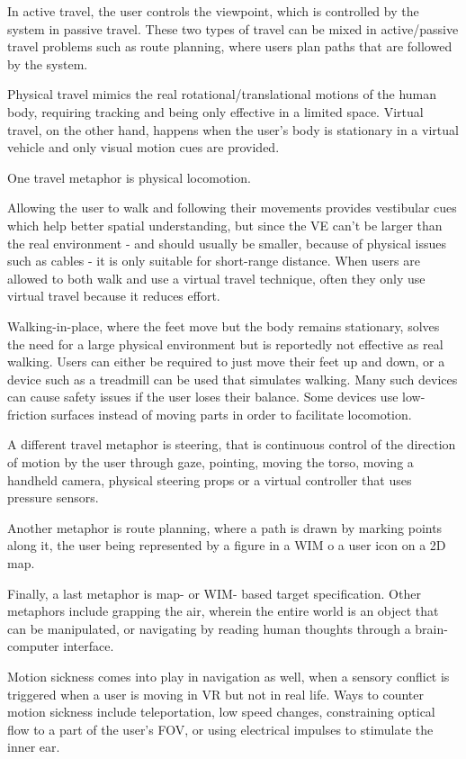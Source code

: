 \documentclass[a4paper]{article}
\begin{document}
In active travel, the user controls the viewpoint, which is controlled by the system in passive travel.
These two types of travel can be mixed in active/passive travel problems such as route planning, where users plan paths that are followed by the system.

Physical travel mimics the real rotational/translational motions of the human body, requiring tracking and being only effective in a limited space.
Virtual travel, on the other hand, happens when the user's body is stationary in a virtual vehicle and only visual motion cues are provided.

One travel metaphor is physical locomotion.

Allowing the user to walk and following their movements provides vestibular cues which help better spatial understanding, but since the VE can't be larger than the real environment - and should usually be smaller, because of physical issues such as cables - it is only suitable for short-range distance.
When users are allowed to both walk and use a virtual travel technique, often they only use virtual travel because it reduces effort.

Walking-in-place, where the feet move but the body remains stationary, solves the need for a large physical environment but is reportedly not effective as real walking.
Users can either be required to just move their feet up and down, or a device such as a treadmill can be used that simulates walking.
Many such devices can cause safety issues if the user loses their balance. Some devices use low-friction surfaces instead of moving parts in order to facilitate locomotion.

A different travel metaphor is steering, that is continuous control of the direction of motion by the user through gaze, pointing, moving the torso, moving a handheld camera, physical steering props or a virtual controller that uses pressure sensors.

Another metaphor is route planning, where a path is drawn by marking points along it, the user being represented by a figure in a WIM o a user icon on a 2D map.

Finally, a last metaphor is map- or WIM- based target specification. Other metaphors include grapping the air, wherein the entire world is an object that can be manipulated, or navigating by reading human thoughts through a brain-computer interface.

Motion sickness comes into play in navigation as well, when a sensory conflict is triggered when a user is moving in VR but not in real life.
Ways to counter motion sickness include teleportation, low speed changes, constraining optical flow to a part of the user's FOV, or using electrical impulses to stimulate the inner ear.
\end{document}
